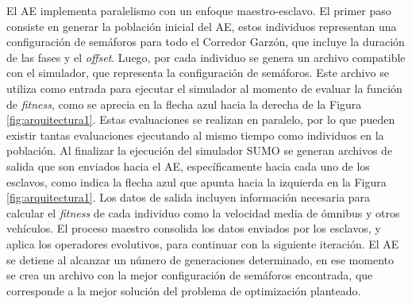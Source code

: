 El AE implementa paralelismo con un enfoque maestro-esclavo. El primer paso consiste en generar la población inicial del AE, estos individuos representan una configuración de semáforos para todo el Corredor Garzón, que incluye la duración de las fases y el \emph{offset}. Luego, por cada individuo se genera un archivo compatible con el simulador, que representa la configuración de semáforos. Este archivo se utiliza como entrada para ejecutar el simulador al momento de evaluar la función de \emph{fitness}, como se aprecia en la flecha azul hacia la derecha de la Figura \ref{fig:arquitectura1}. Estas evaluaciones se realizan en paralelo, por lo que pueden existir tantas evaluaciones ejecutando al mismo tiempo como individuos en la población. Al finalizar la ejecución del simulador SUMO se generan archivos de salida que son enviados hacia el AE, específicamente hacia cada uno de los esclavos, como indica la flecha azul que apunta hacia la izquierda en la Figura \ref{fig:arquitectura1}. Los datos de salida incluyen información necesaria para calcular el \emph{fitness} de cada individuo como la velocidad media de ómnibus y otros vehículos. El proceso maestro consolida los datos enviados por los esclavos, y aplica los operadores evolutivos, para continuar con la siguiente iteración. El AE se detiene al alcanzar un número de generaciones determinado, en ese momento se crea un archivo con la mejor configuración de semáforos encontrada, que corresponde a la mejor solución del problema de optimización planteado. 




